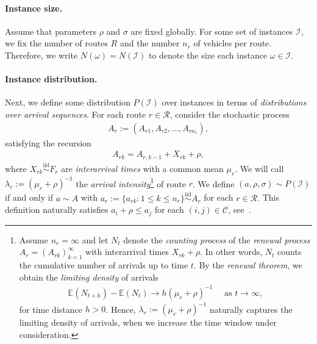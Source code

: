 \documentclass[a4paper]{report}
\theoremstyle{definition}
\theoremstyle{plain}
\begin{document}
\paragraph{Instance size.}
Assume that parameters $\rho$ and $\sigma$ are fixed globally.
%
For some set of instances $\mathcal{I}$, we fix the number of routes $R$ and the
number $n_r$ of vehicles per route. Therefore, we write
$N(\omega) = N(\mathcal{I})$ to denote the size each instance
$\omega \in \mathcal{I}$.

\paragraph{Instance distribution.}
Next, we define some distribution $P(\mathcal{I})$ over instances in terms of
\emph{distributions over arrival sequences}.
%
For each route $r \in \mathcal{R}$, consider the stochastic process
\begin{align*}
  A_r := (A_{r1}, A_{r2}, \dots, A_{rn_r}) ,
\end{align*}
satisfying the recursion
\begin{align*}
  A_{rk} = A_{r,k-1} + X_{rk} + \rho ,
\end{align*}
where $X_{rk} \stackrel{\text{iid}}{\sim} F_r$ are \emph{interarrival times}
with a common mean $\mu_r$.
%
We will call $\lambda_r := (\mu_r + \rho)^{-1}$ the \emph{arrival
  intensity}\footnote{Assume $n_r = \infty$ and let $N_t$ denote the
  \emph{counting process} of the \emph{renewal process}
  $A_r = (A_{rk})_{k=1}^\infty$ with interarrival times $X_{rk} + \rho$.
  In other words, $N_{t}$ counts the cumulative number of arrivals up to time
  $t$. By the \textit{renewal theorem}, we obtain the \textit{limiting density} of arrivals
  \begin{align*}
    \mathbb{E}(N_{t + h}) - \mathbb{E}(N_{t}) \rightarrow h (\mu_r + \rho)^{-1} \quad \text{ as } t \rightarrow \infty ,
  \end{align*}
  for time distance $h > 0$. Hence, $\lambda_r := {(\mu_r + \rho)}^{-1}$
  naturally captures the limiting density of arrivals, when we increase the time
  window under consideration.} of route $r$.
%
We define $(a,\rho,\sigma) \sim P(\mathcal{I})$ if and only if $a \sim A$ with
$a_r := \{a_{rk} : 1 \leq k \leq n_r \} \stackrel{\text{iid}}{\sim} A_r$ for each $r\in \mathcal{R}$.
%
This definition naturally satisfies $a_i + \rho \leq a_j$ for each
$(i,j) \in \mathcal{C}$, see~.
\end{document}
